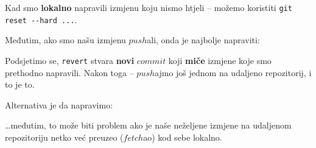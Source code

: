 
Kad smo \textbf{lokalno} napravili izmjenu koju nismo htjeli -- možemo koristiti \verb+git reset --hard ...+.

Međutim, ako smo našu izmjenu $push$ali, onda je najbolje napraviti:


Podsjetimo se, \verb+revert+ stvara \textbf{novi} $commit$ koji \textbf{miče} izmjene koje smo prethodno napravili.
Nakon toga -- $push$ajmo još jednom na udaljeno repozitorij, i to je to.

Alternativa je da napravimo:


\dots{}međutim, to može biti problem ako je naše neželjene izmjene na udaljenom repozitoriju netko već preuzeo ($fetch$ao) kod sebe lokalno.
